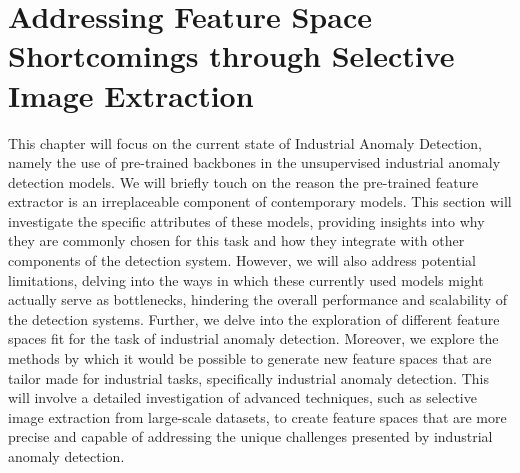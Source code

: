 \chapter{Addressing Feature Space Shortcomings through Selective Image Extraction}
\label{chapter:ch3}

This chapter will focus on the current state of Industrial Anomaly Detection, namely the use of pre-trained backbones in the unsupervised industrial anomaly detection models. We will briefly touch on the reason the pre-trained feature extractor is an irreplaceable component of contemporary models. This section will investigate the specific attributes of these models, providing insights into why they are commonly chosen for this task and how they integrate with other components of the detection system. However, we will also address potential limitations, delving into the ways in which these currently used models might actually serve as bottlenecks, hindering the overall performance and scalability of the detection systems. Further, we delve into the exploration of different feature spaces fit for the task of industrial anomaly detection. Moreover, we explore the methods by which it would be possible to generate new feature spaces that are tailor made for industrial tasks, specifically industrial anomaly detection. This will involve a detailed investigation of advanced techniques, such as selective image extraction from large-scale datasets, to create feature spaces that are more precise and capable of addressing the unique challenges presented by industrial anomaly detection.

